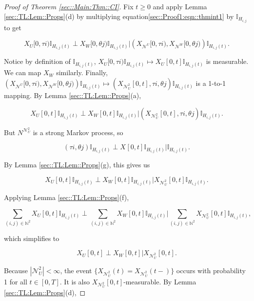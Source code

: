 \documentclass[12pt]{article}
\newcommand{\mb}{\mathbb}
\newcommand{\mc}{\mathcal}
\newcommand{\ind}{\hspace{24pt}}
\renewcommand{\U}{U}							%
\newcommand{\UU}{W}								%
\newcommand{\T}{T}								%
\renewcommand{\t}{t}							%
\newcommand{\X}{X}								%
\newcommand{\neigh}{\mc{N}}						%
\newcommand{\dneigh}{\mc{N}^2}					%
\newcommand{\vind}[1]{^{#1}}					%
\newcommand{\cind}[1]{_{#1}}					%
\newcommand{\tp}[1]{(#1)}						%
\newcommand{\tip}[1]{#1}						%
\newcommand{\poiss}{N}							%
\newcommand{\dnvind}[1]{_{#1}}				%
\newcommand{\rt}{\tau}							%
\newcommand{\rtt}{\theta}						%
\newcommand{\pathseted}[2]{H_{#1,#2}}			%
\begin{document}
\begin{proof}[Proof of Theorem \ref{sec::Main:Thm::CI}]
\ind Fix \(\t \geq 0\) and apply Lemma \ref{sec::TL:Lem::Props}(d) by multiplying equation\eqref{sec::Proof1:eqn::thmint1} by \(\mb{I}_{\pathseted{i}{j}}\) to get

\[\X\cind{\U}\tip{[0,\rt{i})}\mb{I}_{\pathseted{i}{j}(\t)}\perp\X\cind{\UU}\tip{[0,\rtt{j})}\mb{I}_{\pathseted{i}{j}(\t)}\big|\left(\X\cind{\neigh\vind{\U}}\tip{[0,\rt{i})},\X\cind{\neigh\vind{\UU}}\tip{[0,\rtt{j})}\right)\mb{I}_{\pathseted{i}{j}(\t)}.\]


Notice by definition of \(\mb{I}_{\pathseted{i}{j}(\t)}\), \(\X\cind{\U}\tip{[0,\rt{i})}\mb{I}_{\pathseted{i}{j}(\t)} \mapsto \X\cind{\U}\tip{[0,\t]}\mb{I}_{\pathseted{i}{j}(\t)}\) is measurable. We can map \(\X\cind{\UU}\tip{}\) similarly. Finally, \(\left(\X\cind{\neigh\vind{\U}}\tip{[0,\rt{i})},\X\cind{\neigh\vind{\UU}}\tip{[0,\rtt{j})}\right)\mb{I}_{\pathseted{i}{j}(\t)}\mapsto (\X\cind{\dneigh\dnvind{\U}}\tip{[0,\t]}, \rt{i},\rtt{j})\mb{I}_{\pathseted{i}{j}(\t)}\) is a 1-to-1 mapping. By Lemma \ref{sec::TL:Lem::Props}(a),

\[\X\cind{\U}\tip{[0,\t]}\mb{I}_{\pathseted{i}{j}(\t)}\perp\X\cind{\UU}\tip{[0,\t]}\mb{I}_{\pathseted{i}{j}(\t)}\big|\left(\X\cind{\dneigh\dnvind{\U}}\tip{[0,\t]},\rt{i},\rtt{j}\right)\mb{I}_{\pathseted{i}{j}(\t)}.\]

But \(\poiss\vind{\dneigh\dnvind{\U}}\) is a strong Markov process, so 

\[(\rt{i},\rtt{j})\mb{I}_{\pathseted{i}{j}(\t)}\perp \X\cind{}\tip{[0,\t]}\mb{I}_{\pathseted{i}{j}(\t)}|\mb{I}_{\pathseted{i}{j}(\t)}.\]

By Lemma \ref{sec::TL:Lem::Props}(g), this gives us

\[\X\cind{\U}\tip{[0,\t]}\mb{I}_{\pathseted{i}{j}(\t)}\perp\X\cind{\UU}\tip{[0,\t]}\mb{I}_{\pathseted{i}{j}(\t)}\big|\X\cind{\dneigh\dnvind{\U}}\tip{[0,\t]}\mb{I}_{\pathseted{i}{j}(\t)}.\]

Applying Lemma \ref{sec::TL:Lem::Props}(f),

\[\sum_{(i,j)\in\mb{N}^2}\X\cind{\U}\tip{[0,\t]}\mb{I}_{\pathseted{i}{j}(\t)}\perp\sum_{(i,j)\in\mb{N}^2}\X\cind{\UU}\tip{[0,\t]}\mb{I}_{\pathseted{i}{j}(\t)}\bigg|\sum_{(i,j)\in\mb{N}^2}\X\cind{\dneigh\dnvind{\U}}\tip{[0,\t]}\mb{I}_{\pathseted{i}{j}(\t)},\]

which simplifies to 

\[\X\cind{\U}\tip{[0,\t]}\perp\X\cind{\UU}\tip{[0,\t]}\big|\X\cind{\dneigh\dnvind{\U}}\tip{[0,\t]}.\]

Because \(|\dneigh\dnvind{\U}| < \infty\), the event \(\{\X\cind{\dneigh\dnvind{\U}}\tp{\t} = \X\cind{\dneigh\dnvind{\U}}\tp{\t-}\}\) occurs with probability 1 for all \(\t \in [0,\T]\). It is also \(\X\cind{\dneigh\dnvind{\U}}\tip{[0,\t]}\)-measurable. By Lemma \ref{sec::TL:Lem::Props}(d),


\end{proof}
\end{document}
